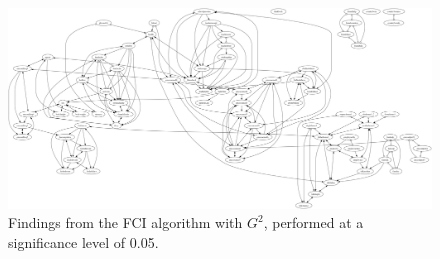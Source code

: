 \begin{figure}[ht]
    \centering
    \includegraphics[scale=0.1]{Report/final_report/pictures/FCI_gsq_0.05_all_UA_78_famdec.png}
    \caption{Findings from the FCI algorithm with $G^2$, performed at a significance level of 0.05.}
    \label{fig:fci_gsq_0.05all_UA_78_famdec}
\end{figure}
